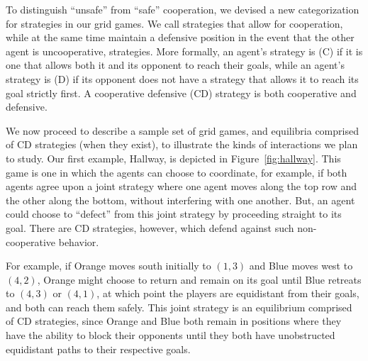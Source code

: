 To distinguish ``unsafe'' from ``safe'' cooperation, we devised a new
categorization for strategies in our grid games.  We call strategies
that allow for cooperation, while at the same time maintain a
defensive position in the event that the other agent is uncooperative,
 strategies.  More formally, an agent's
strategy is  (C) if it is one that allows both it
and its opponent to reach their goals, while an agent's strategy is
 (D) if its opponent does not have a strategy that
allows it to reach its goal strictly first.  A cooperative defensive
(CD) strategy is both cooperative and defensive.

We now proceed to describe a sample set of grid games, and equilibria
comprised of CD strategies (when they exist), to illustrate the kinds
of interactions we plan to study.
%
Our first example, Hallway, is depicted in Figure~\ref{fig:hallway}.
This game is one in which the agents can choose to coordinate, for
example, if both agents agree upon a joint strategy where one agent
moves along the top row and the other along the bottom, without
interfering with one another.  But, an agent could choose to ``defect''
from this joint strategy by proceeding straight to its goal.  There
are CD strategies, however, which defend against such non-cooperative
behavior.

For example, if Orange moves south initially to $(1,3)$ and Blue moves
west to $(4,2)$, Orange might choose to return and remain on its goal
until Blue retreats to $(4,3)$ or $(4,1)$, at which point the players
are equidistant from their goals, and both can reach them safely.
This joint strategy is an equilibrium comprised of CD strategies,
since Orange and Blue both remain in positions where they have the
ability to block their opponents until they both have unobstructed
equidistant paths to their respective goals.


